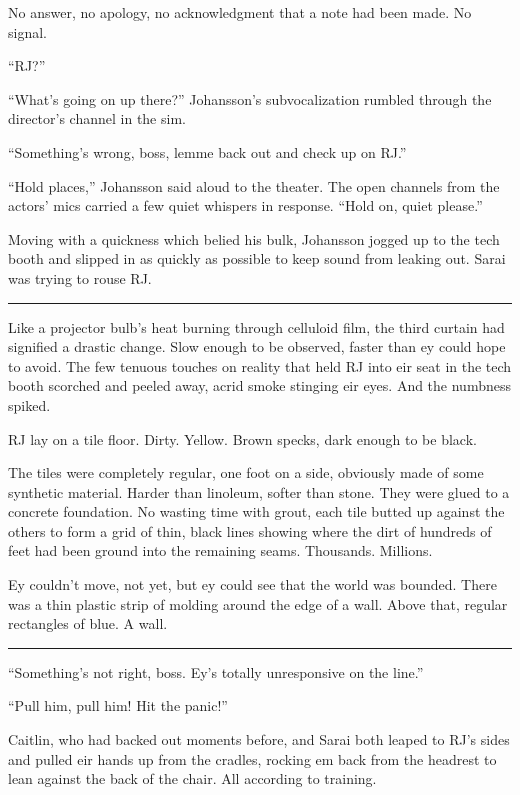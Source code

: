 No answer, no apology, no acknowledgment that a note had been made. No signal.

``RJ?''

``What's going on up there?'' Johansson's subvocalization rumbled through the director's channel in the sim.

``Something's wrong, boss, lemme back out and check up on RJ.''

``Hold places,'' Johansson said aloud to the theater. The open channels from the actors' mics carried a few quiet whispers in response. ``Hold on, quiet please.''

Moving with a quickness which belied his bulk, Johansson jogged up to the tech booth and slipped in as quickly as possible to keep sound from leaking out. Sarai was trying to rouse RJ.

\begin{center}\rule{0.5\linewidth}{0.5pt}\end{center}

Like a projector bulb's heat burning through celluloid film, the third curtain had signified a drastic change. Slow enough to be observed, faster than ey could hope to avoid. The few tenuous touches on reality that held RJ into eir seat in the tech booth scorched and peeled away, acrid smoke stinging eir eyes. And the numbness spiked.

RJ lay on a tile floor. Dirty. Yellow. Brown specks, dark enough to be black.

The tiles were completely regular, one foot on a side, obviously made of some synthetic material. Harder than linoleum, softer than stone. They were glued to a concrete foundation. No wasting time with grout, each tile butted up against the others to form a grid of thin, black lines showing where the dirt of hundreds of feet had been ground into the remaining seams. Thousands. Millions.

Ey couldn't move, not yet, but ey could see that the world was bounded. There was a thin plastic strip of molding around the edge of a wall. Above that, regular rectangles of blue. A wall.

\begin{center}\rule{0.5\linewidth}{0.5pt}\end{center}

``Something's not right, boss. Ey's totally unresponsive on the line.''

``Pull him, pull him! Hit the panic!''

Caitlin, who had backed out moments before, and Sarai both leaped to RJ's sides and pulled eir hands up from the cradles, rocking em back from the headrest to lean against the back of the chair. All according to training.

